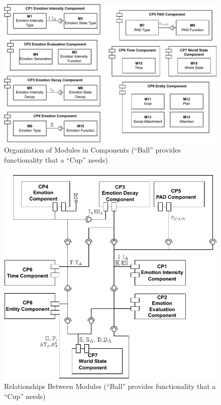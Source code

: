 \vspace*{\fill}
\begin{figure}[!ht]
    \centering
    \includegraphics[width=\linewidth]{figures/emgineArch_internalComponents.pdf}
    \caption{Organization of Modules in Components (``Ball'' provides
    functionality that a ``Cup'' needs)}
    \label{fig:components}
\end{figure}
\vspace*{\fill}

\begin{figure}[!ht]
    \centering
    \includegraphics[width=0.7\linewidth]{figures/emgineArch_componentRelations.pdf}
    \caption{Relationships Between Modules (``Ball'' provides functionality
    that a ``Cup'' needs)}
    \label{fig:componentConnections}
\end{figure}